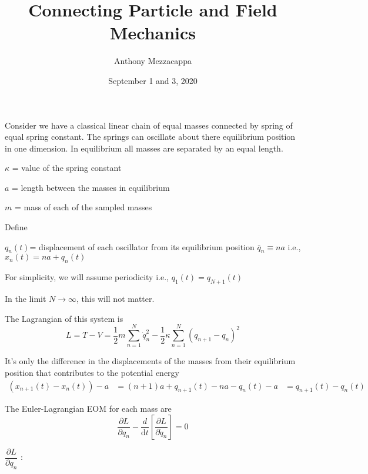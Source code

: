 \documentclass{article}
\title{Connecting Particle and Field Mechanics}
\author{Anthony Mezzacappa}
\date{September 1 and 3, 2020}
\begin{document}
\setlength{\parskip}{1em}

\maketitle

\noindent Consider we have a classical linear chain of equal masses connected by spring of equal spring constant. The springs can oscillate about there equilibrium position in one dimension. In equilibrium all masses are separated by an equal length. \par

$\kappa$ = value of the spring constant \par
$a$ = length between the masses in equilibrium\par
$m$ = mass of each of the sampled masses\par


\noindent Define \par
\noindent $q_n(t) $= displacement of each oscillator from its equilibrium position $\bar{q}_n \equiv na $ i.e., $x_n(t) = na+q_n(t)$ \par
\noindent For simplicity, we will assume periodicity i.e., $q_1(t) =q_{N+1}(t)$ \par
\noindent In the limit $N \rightarrow \infty$, this will not matter. \par


\noindent The Lagrangian of this system is
\begin{equation}
    L = T - V  = \frac{1}{2} m \sum_{n=1}^N \dot{q}_n^2 - \frac{1}{2} \kappa \sum_{n=1}^N (q_{n+1} - q_n)^2
\end{equation}

\noindent It's only the difference in the displacements of the masses from their equilibrium position that contributes to the potential energy
\begin{align*}
    \left( x_{n+1} (t) - x_n (t) \right) - a &= ( n + 1 ) a + q_{n+1} (t) - n a - q_n (t) - a 
    &= q_{n+1} (t) - q_n (t)
\end{align*}

\noindent The Euler-Lagrangian EOM for each mass are
\begin{equation}
    \dfrac{ \partial L }{ \partial q_n} -  \dfrac{d}{ \mathrm{d} t} \left[\dfrac{ \partial L }{ \partial \dot {q}_n } \right] = 0
\end{equation}

$\dfrac{ \partial L }{ \partial q_n}$ :
\end{document}

